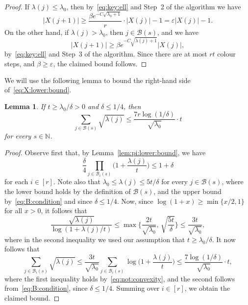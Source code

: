\documentclass[12pt,reqno]{amsart}
\newtheorem{lemma}[theorem]{Lemma}
\theoremstyle{definition}
\theoremstyle{remark}
\newcommand\N{\mathbb{N}}
\newcommand\cB{\mathcal{B}}
\newcommand\eps{\varepsilon}
\renewcommand{\le}{\leqslant}
\renewcommand{\ge}{\geqslant}
\def\eps{\varepsilon}
\def\N{\mathbb{N}}
\def\cB{\mathcal{B}}
\begin{document}
\begin{proof}
If $\lambda(j) \le \lambda_0$, then by~\eqref{eq:key:ell} and Step~2 of the algorithm we have
$$|X(j+1)| \ge \frac{\beta e^{- C \sqrt{\lambda_0 + 1}}}{r} \cdot |X(j)| - 1 = \eps |X(j)| - 1.$$ 
On the other hand, if $\lambda(j) > \lambda_0$, then $j \in \cB(s)$, and we have 
$$|X(j+1)| \ge \beta e^{- C \sqrt{\lambda(j) + 1}} |X(j)|,$$ 
by~\eqref{eq:key:ell} and Step~3 of the algorithm. Since there are at most $rt$ colour steps, and $\beta \ge \eps$, the claimed bound follows.
\end{proof}

We will use the following lemma to bound the right-hand side of~\eqref{eq:X:lower:bound}. 

\begin{lemma}\label{lem:sum:of:lambdas}
If\/ $t \ge \lambda_0 / \delta > 0$ and\/ $\delta \le 1/4$, then
$$\sum_{j \in \cB(s)} \sqrt{\lambda(j)} \le \frac{7r \log(1/\delta)}{\sqrt{\lambda_0}} \cdot t$$
for every $s \in \N$. 
\end{lemma}

\begin{proof}
Observe first that, by Lemma~\ref{lem:pi:lower:bound}, we have 
\begin{equation}\label{eq:B:condition}
\frac{\delta}{4} \prod_{j \in \cB_i(s)} \bigg( 1 + \frac{\lambda(j)}{t} \bigg) \le 1 + \delta
\end{equation}
for each $i \in [r]$. Note also that $\lambda_0 \le \lambda(j) \le 5t/\delta$ for every $j \in \cB(s)$, where the lower bound holds by the definition of $\cB(s)$, and the upper bound by~\eqref{eq:B:condition} and since $\delta \le 1/4$. Now, since $\log(1+x) \ge \min\{ x/2,1\}$ for all $x > 0$, it follows that
\begin{equation}\label{eq:not:convexity}
\frac{ \sqrt{\lambda(j)} }{\log(1 + \lambda(j)/t) } \le \max\bigg\{ \frac{ 2t }{ \sqrt{\lambda_0} }, \, \sqrt{ \frac{5t}{\delta}} \bigg\} \le \frac{ 3t }{ \sqrt{\lambda_0} },
\end{equation}
where in the second inequality we used %
our assumption that $t \ge \lambda_0 / \delta$. It now follows that
$$\sum_{j \in \cB_i(s)} \sqrt{\lambda(j)} \le \frac{ 3t }{ \sqrt{\lambda_0} } \sum_{j \in \cB_i(s)} \log \bigg( 1 + \frac{\lambda(j)}{t} \bigg) \le \frac{7 \log(1/\delta)}{\sqrt{\lambda_0}} \cdot t,$$
where the first inequality holds by~\eqref{eq:not:convexity}, and the second follows from~\eqref{eq:B:condition}, since $\delta \le 1/4$. Summing over $i \in [r]$, we obtain the claimed bound. 
\end{proof}
\end{document}
